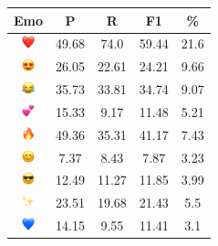 \documentclass{article}
\begin{document}
\begin{table}
\centering
\begin{tabular}{|c|ccc|c|} \hline
\textbf{Emo} & \textbf{P} & \textbf{R} & \textbf{F1} & \textbf{\%} \\ \hline
\includegraphics[height=0.37cm,width=0.37cm]{img/red_heart.png} & 49.68 & 74.0 & 59.44 & 21.6\\ 
\includegraphics[height=0.37cm,width=0.37cm]{img/smiling_face_with_hearteyes.png} & 26.05 & 22.61 & 24.21 & 9.66\\ 
\includegraphics[height=0.37cm,width=0.37cm]{img/face_with_tears_of_joy.png} & 35.73 & 33.81 & 34.74 & 9.07\\ 
\includegraphics[height=0.37cm,width=0.37cm]{img/two_hearts.png} & 15.33 & 9.17 & 11.48 & 5.21\\ 
\includegraphics[height=0.37cm,width=0.37cm]{img/fire.png} & 49.36 & 35.31 & 41.17 & 7.43\\ 
\includegraphics[height=0.37cm,width=0.37cm]{img/smiling_face_with_smiling_eyes.png} & 7.37 & 8.43 & 7.87 & 3.23\\ 
\includegraphics[height=0.37cm,width=0.37cm]{img/smiling_face_with_sunglasses.png} & 12.49 & 11.27 & 11.85 & 3.99\\ 
\includegraphics[height=0.37cm,width=0.37cm]{img/sparkles.png} & 23.51 & 19.68 & 21.43 & 5.5\\ 
\includegraphics[height=0.37cm,width=0.37cm]{img/blue_heart.png} & 14.15 & 9.55 & 11.41 & 3.1\\ 

\end{tabular}
\end{table}
\end{document}
